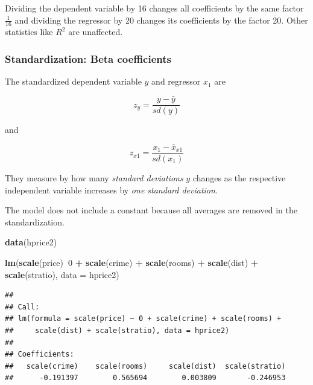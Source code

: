 \documentclass[]{book}
\newenvironment{Shaded}{\begin{snugshade}}{\end{snugshade}}
\newcommand{\DataTypeTok}[1]{\textcolor[rgb]{0.13,0.29,0.53}{#1}}
\newcommand{\DecValTok}[1]{\textcolor[rgb]{0.00,0.00,0.81}{#1}}
\newcommand{\KeywordTok}[1]{\textcolor[rgb]{0.13,0.29,0.53}{\textbf{#1}}}
\newcommand{\NormalTok}[1]{#1}
\newcommand{\OperatorTok}[1]{\textcolor[rgb]{0.81,0.36,0.00}{\textbf{#1}}}
\newcommand{\StringTok}[1]{\textcolor[rgb]{0.31,0.60,0.02}{#1}}
\begin{document}
Dividing the dependent variable by 16 changes all coefficients by the
same factor \(\frac{1}{16}\) and dividing the regressor by 20 changes
its coefficients by the factor 20. Other statistics like \(R^2\) are
unaffected.

\hypertarget{standardization-beta-coefficients}{%
\subsubsection{Standardization: Beta
coefficients}\label{standardization-beta-coefficients}}

The standardized dependent variable \(y\) and regressor \(x_1\) are

\begin{equation}
z_y=\frac{y-\bar{y}}{sd(y)}
\end{equation}

and

\begin{equation}
z_{x1}=\frac{x_{1}-\bar{x}_{x1}}{sd(x_{1})}
\end{equation}

They measure by how many \emph{standard deviations} \(y\) changes as the
respective independent variable increases by \emph{one standard
deviation}.

The model does not include a constant because all averages are removed
in the standardization.

\begin{Shaded}
\begin{Highlighting}[]
\KeywordTok{data}\NormalTok{(hprice2)}
\end{Highlighting}
\end{Shaded}

\begin{Shaded}
\begin{Highlighting}[]
\KeywordTok{lm}\NormalTok{(}\KeywordTok{scale}\NormalTok{(price)}\OperatorTok{~}\DecValTok{0} \OperatorTok{+}\StringTok{  }\KeywordTok{scale}\NormalTok{(crime) }\OperatorTok{+}\StringTok{  }\KeywordTok{scale}\NormalTok{(rooms) }\OperatorTok{+}\StringTok{ }\KeywordTok{scale}\NormalTok{(dist) }\OperatorTok{+}\StringTok{  }\KeywordTok{scale}\NormalTok{(stratio), }\DataTypeTok{data =}\NormalTok{ hprice2)}
\end{Highlighting}
\end{Shaded}

\begin{verbatim}
## 
## Call:
## lm(formula = scale(price) ~ 0 + scale(crime) + scale(rooms) + 
##     scale(dist) + scale(stratio), data = hprice2)
## 
## Coefficients:
##   scale(crime)    scale(rooms)     scale(dist)  scale(stratio)  
##      -0.191397        0.565694        0.003809       -0.246953
\end{verbatim}
\end{document}
